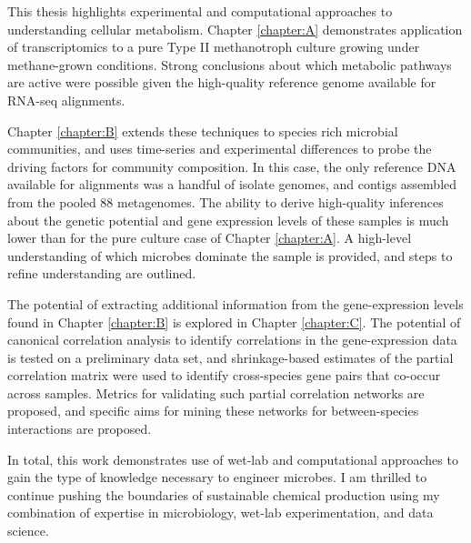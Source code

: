 This thesis highlights experimental and computational approaches to understanding cellular metabolism.
Chapter \ref{chapter:A} demonstrates application of transcriptomics to a pure Type II methanotroph culture growing under methane-grown conditions.
Strong conclusions about which metabolic pathways are active were possible given the high-quality reference genome available for RNA-seq alignments.

Chapter \ref{chapter:B} extends these techniques to species rich microbial communities, and uses time-series and experimental differences to probe the driving factors for community composition.
In this case, the only reference DNA available for alignments was a handful of isolate genomes, and contigs assembled from the pooled 88 metagenomes.
The ability to derive high-quality inferences about the genetic potential and gene expression levels of these samples is much lower than for the pure culture case of Chapter \ref{chapter:A}.
A high-level understanding of which microbes dominate the sample is provided, and steps to refine understanding are outlined.

The potential of extracting additional information from the gene-expression levels found in Chapter \ref{chapter:B} is explored in Chapter \ref{chapter:C}.
The potential of canonical correlation analysis to identify correlations in the gene-expression data is tested on a preliminary data set, and shrinkage-based estimates of the partial correlation matrix were used to identify cross-species gene pairs that co-occur across samples.
Metrics for validating such partial correlation networks are proposed, and specific aims for mining these networks for between-species interactions are proposed.

In total, this work demonstrates use of wet-lab and computational approaches to gain the type of knowledge necessary to engineer microbes.
I am thrilled to continue pushing the boundaries of sustainable chemical production using my combination of expertise in microbiology, wet-lab experimentation, and data science.

